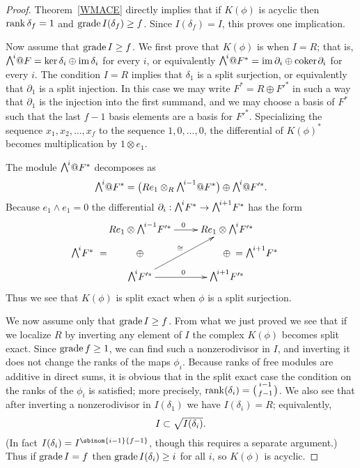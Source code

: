 \begin{proof}
Theorem~\ref{WMACE} 
directly 
implies that if $K(\phi)$ is acyclic then
$\operatorname{rank} \delta_{f} = 1$ and $\operatorname{grade} I(\delta_{f}) \geq f$. Since
$I(\delta_{f}) = I$, this proves one implication.

Now assume that $\operatorname{grade} I \geq f$. We first prove that
$K(\phi)$ is 
%
when $I = R$; that is, 
$\mwedge^{i}@F = \ker \delta_{i} \oplus \im \delta_{i}$ 
for every $i$, or equivalently
$\mwedge^{i}@F^{*} = \im \partial_{i}\oplus\coker \partial_{i}$ for
every $i$. The condition $I=R$ implies that $\delta_{1}$ is a split
surjection,
or equivalently that
$\partial_{1}$ is a split injection. In this case we may write $F^{*}
= R\oplus F'^{*}$ in such a way that $\partial_{1}$ is the injection
into the first summand, and we may
choose a basis of $F^{*}$ such that the last $f-1$ basis
elements are a basis for $F'^{*}$.
Specializing the sequence $x_{1},x_{2}, \dots, x_{f}$ to the sequence $1,
0,\dots, 0$, the differential of $K(\phi)^{*}$
becomes  multiplication by  $1\otimes e_{1}$.

The module
$\mwedge^{i}@F^{*}$  decomposes as
$$
\mwedge^{i}@F^{*} = \bigl(Re_{1}\otimes_{R} \mwedge^{i-1}@F^{*} \bigr)
\oplus \mwedge^{i}@F'^{*}.
$$
Because $e_{1}\wedge e_{1} = 0$ the differential 
$\partial_{i}: \mwedge^{i}F^{*} \to \mwedge^{i+1}F^{*}$ has the form
$$
\xymatrix@R=6pt{
Re_{1}\otimes \mwedge^{i-1}F'^{*} \ar[r]^{0}&  Re_{1}\otimes \mwedge^{i}F'^{*}\\
\llap{$\mwedge^{i}F^{*}\ =$\hskip3em}
 \oplus&\oplus\rlap{$\quad= \mwedge^{i+1}F^{*}$}\\
\mwedge^{i}F'^{*}\ar[uur]^{\cong}\ar[r]^{0}& \mwedge^{i+1}F'^{*}
}
$$
Thus we see that $K(\phi)$ is split exact when $\phi$ is a split
surjection.

We now assume only that $\operatorname{grade} I\geq f$. From what we just proved we
see that if we localize
$R$ by inverting any element of $I$ the complex $K(\phi)$ becomes split
exact. Since $\operatorname{grade} f\geq 1$,
we can find such  a nonzerodivisor in $I$, and inverting it does not
change the ranks of the
maps $\phi_{i}$. Because ranks of free modules are additive in direct
sums, it is obvious that
in the split exact case the condition on the ranks of the $\phi_{i}$
is satisfied; more precisely,
$\rank(\delta_{i}) = \tbinom{i-1}{f-1}$. We also see that after inverting
a nonzerodivisor in $I(\delta_{1})$ we have $I(\delta_{i}) = R$;
equivalently,
$$
\tsty %
I  \subset \sqrt {I(\delta_{i})}.
$$
(In fact $I(\delta_{i}) = I^{\sbinom{i-1}{f-1}}$, though this requires a
separate argument.) Thus if $\operatorname{grade} I = f$ then  $\operatorname{grade} I(\delta_{i})
\geq i$ for all $i$, so $K(\phi)$ is acyclic.
\end{proof}


